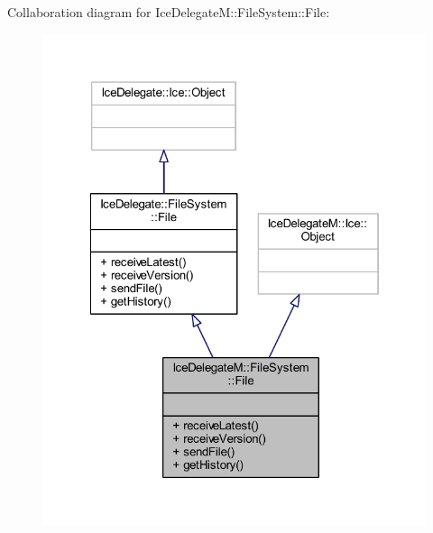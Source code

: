 Collaboration diagram for Ice\+Delegate\+M\+:\+:File\+System\+:\+:File\+:
\nopagebreak
\begin{figure}[H]
\begin{center}
\leavevmode
\includegraphics[width=322pt]{class_ice_delegate_m_1_1_file_system_1_1_file__coll__graph}
\end{center}
\end{figure}
